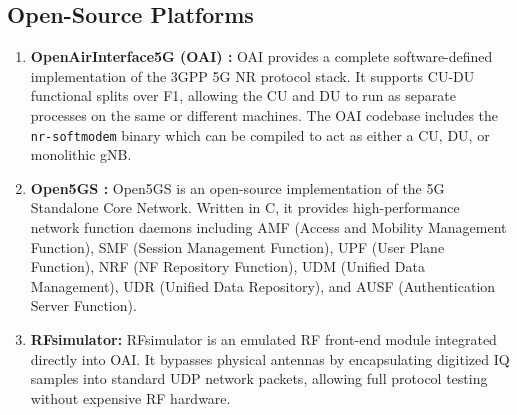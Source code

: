 \subsection{Open-Source Platforms}
\begin{enumerate}[leftmargin=*]
    \item \textbf{OpenAirInterface5G (OAI) \cite{oai_ref}:} OAI provides a complete software-defined implementation of the 3GPP 5G NR protocol stack. It supports CU-DU functional splits over F1, allowing the CU and DU to run as separate processes on the same or different machines. The OAI codebase includes the \texttt{nr-softmodem} binary which can be compiled to act as either a CU, DU, or monolithic gNB.
    
    \item \textbf{Open5GS \cite{open5gs_ref}:} Open5GS is an open-source implementation of the 5G Standalone Core Network. Written in C, it provides high-performance network function daemons including AMF (Access and Mobility Management Function), SMF (Session Management Function), UPF (User Plane Function), NRF (NF Repository Function), UDM (Unified Data Management), UDR (Unified Data Repository), and AUSF (Authentication Server Function).
    
    \item \textbf{RFsimulator:} RFsimulator is an emulated RF front-end module integrated directly into OAI. It bypasses physical antennas by encapsulating digitized IQ samples into standard UDP network packets, allowing full protocol testing without expensive RF hardware.
\end{enumerate}


